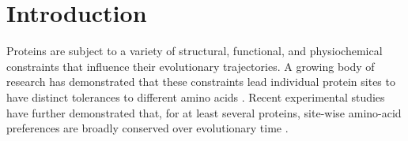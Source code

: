 \documentclass[11pt]{article}
\begin{document}
\begin{abstract}
\end{abstract}

\newpage







\section*{Introduction}
Proteins are subject to a variety of structural, functional, and physiochemical constraints that influence their evolutionary trajectories. A growing body of research has demonstrated that these constraints lead individual protein sites to have distinct tolerances to different amino acids \citep{Porto2004, Ramseyetal2011, Pollacketal2012, Ashenbergetal2013, Rissoetal2014, Bloom2014a, Bloom2014b, Abriataetal2015, Doudetal2015,EchaveSpielmanWilke2016}. Recent experimental studies have further demonstrated that, for at least several proteins, site-wise amino-acid preferences are broadly conserved over evolutionary time \citep{Ashenbergetal2013, Rissoetal2014, Doudetal2015}.
\end{document}
